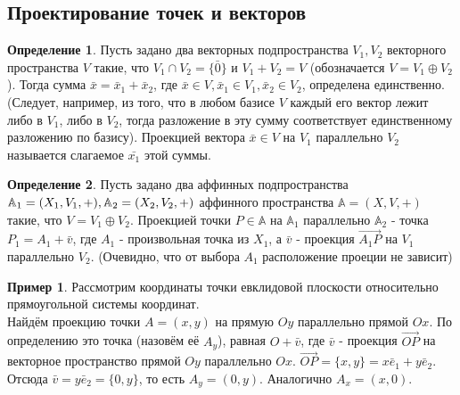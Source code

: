 \documentclass[a4paper, 12pt]{article}
\theoremstyle{definition}
\newtheorem*{definition}{Определение}
\newtheorem*{example}{Пример}
\begin{document}
	\subsection{Проектирование точек и векторов}
	\begin{definition}
		Пусть задано два векторных подпространства $V_{1}, V_{2}$ векторного пространства $V$ такие, что $V_{1} \cap V_{2} = \{\bar{0}\}$ и $V_{1} + V_{2} = V$ (обозначается $V = V_{1} \oplus V_{2}$). Тогда сумма $\bar{x} = \bar{x}_{1} + \bar{x}_{2}$, где $\bar{x} \in V, \bar{x}_{1} \in V_{1}, \bar{x}_{2} \in V_{2}$, определена единственно. (Следует, например, из того, что в любом базисе $V$ каждый его вектор лежит либо в $V_{1}$, либо в $V_{2}$, тогда разложение в эту сумму соответствует единственному разложению по базису). Проекцией вектора $\bar{x} \in V$ на $V_{1}$ параллельно $V_{2}$ называется слагаемое $\bar{x_{1}}$ этой суммы. 
	\end{definition}
	\begin{definition}
		Пусть задано два аффинных подпространства $\mathbb{A}_{1} = (X_{1}, V_{1}, +),\\ \mathbb{A}_{2} = (X_{2}, V_{2}, +)$ аффинного пространства $\mathbb{A} = (X, V, +)$ такие, что $V = V_{1} \oplus V_{2}$. Проекцией точки $P \in \mathbb{A}$ на $\mathbb{A}_{1}$ параллельно $\mathbb{A}_{2}$ - точка $P_{1} = A_{1} + \bar{v}$, где $A_{1}$ - произвольная точка из $X_{1}$, а $\bar{v}$ - проекция $\overrightarrow{A_{1}P}$ на $V_{1}$ параллельно $V_{2}$.
		(Очевидно, что от выбора $A_{1}$ расположение проеции не зависит)
	\end{definition}
	\begin{example}
		Рассмотрим координаты точки евклидовой плоскости относительно прямоугольной системы координат. \\
		Найдём проекцию точки $A = (x, y)$ на прямую $Oy$ параллельно прямой $Ox$. По определению это точка (назовём её $A_{y}$), равная $O + \bar{v}$, где $\bar{v}$ - проекция $\overrightarrow{OP}$ на векторное пространство прямой $Oy$ параллельно $Ox$. $\overrightarrow{OP} = \{x, y\} = x\bar{e}_{1} + y\bar{e}_{2}$. Отсюда $\bar{v} = y\bar{e}_{2} = \{0, y\}$, то есть $A_{y} = (0, y)$. Аналогично $A_{x} = (x, 0)$. 
	\end{example}
\end{document}

